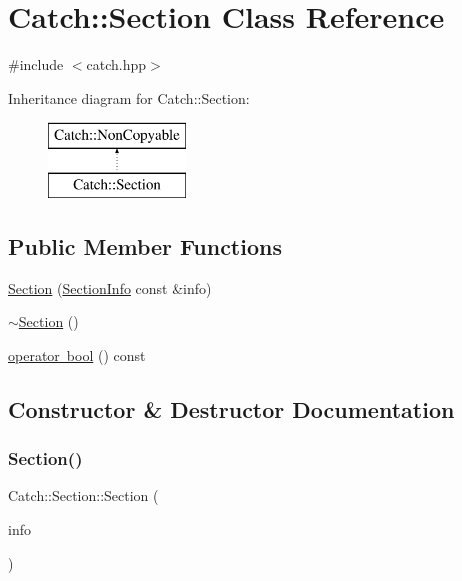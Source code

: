 \hypertarget{classCatch_1_1Section}{}\section{Catch\+:\+:Section Class Reference}
\label{classCatch_1_1Section}


{\ttfamily \#include $<$catch.\+hpp$>$}

Inheritance diagram for Catch\+:\+:Section\+:\begin{figure}[H]
\begin{center}
\leavevmode
\includegraphics[height=2.000000cm]{classCatch_1_1Section}
\end{center}
\end{figure}
\subsection*{Public Member Functions}
\begin{DoxyCompactItemize}
\item 
\mbox{\hyperlink{classCatch_1_1Section_a68fd4e51e8981aaa7ddb00d8a6abd099}{Section}} (\mbox{\hyperlink{structCatch_1_1SectionInfo}{Section\+Info}} const \&info)
\item 
\mbox{\hyperlink{classCatch_1_1Section_aa1422edd68a77aa578b5cc6b8b69f86f}{$\sim$\+Section}} ()
\item 
\mbox{\hyperlink{classCatch_1_1Section_a0632b804dcea1417a2970620a9742eb3}{operator bool}} () const
\end{DoxyCompactItemize}


\subsection{Constructor \& Destructor Documentation}
\mbox{\label{classCatch_1_1Section_a68fd4e51e8981aaa7ddb00d8a6abd099}} 
\subsubsection{\texorpdfstring{Section()}{Section()}}
{\footnotesize\ttfamily Catch\+::\+Section\+::\+Section (\begin{DoxyParamCaption}\item[{\mbox{\hyperlink{structCatch_1_1SectionInfo}{Section\+Info}} const \&}]{info }\end{DoxyParamCaption})}


